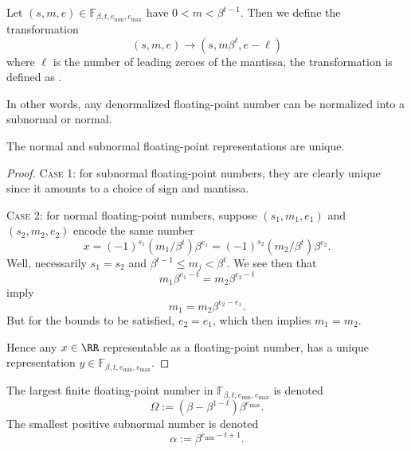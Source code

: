 \begin{defn}
Let $(s,m,e)\in\mathbb{F}_{\beta,t,e_{\text{min}},e_{\text{max}}}$
have $0<m<\beta^{t-1}$. Then we define the transformation
\begin{equation}
  (s,m,e)\to(s,m\beta^{\ell},e-\ell)
\end{equation}
where $\ell$ is the number of leading zeroes of the mantissa, the
transformation is defined as .
\end{defn}

\begin{rmk}
In other words, any denormalized floating-point number can be normalized
into a subnormal or normal.
\end{rmk}


\begin{thm}
The normal and subnormal floating-point representations are unique.
\end{thm}
\begin{proof}
\textsc{Case 1:} for subnormal floating-point numbers, they are clearly
unique since it amounts to a choice of sign and mantissa.

\textsc{Case 2:} for normal floating-point numbers, suppose
$(s_{1},m_{1},e_{1})$ and $(s_{2},m_{2},e_{2})$ encode the same number
\begin{equation}
  x = (-1)^{s_{1}}(m_{1}/\beta^{t})\beta^{e_{1}} = (-1)^{s_{2}}(m_{2}/\beta^{t})\beta^{e_{2}}.
\end{equation}
Well, necessarily $s_{1}=s_{2}$ and $\beta^{t-1}\leq m_{j} < \beta^{t}$.
We see then that
\begin{equation}
  m_{1}\beta^{e_{1}-t} = m_{2}\beta^{e_{2}-t}
\end{equation}
imply
\begin{equation}
  m_{1} = m_{2}\beta^{e_{2}-e_{1}}.
\end{equation}
But for the bounds to be satisfied, $e_{2}=e_{1}$, which then implies
$m_{1}=m_{2}$.

Hence any $x\in\RR$ representable as a floating-point number, has a unique
representation $y\in\mathbb{F}_{\beta,t,e_{\text{min}},e_{\text{max}}}$.
\end{proof}


\begin{defn}
  The largest finite floating-point number in $\mathbb{F}_{\beta,t,e_{\text{min}},e_{\text{max}}}$
  is denoted
  \begin{equation}
    \Omega := (\beta - \beta^{1-t})\beta^{e_{\text{max}}}.
  \end{equation}
  The smallest positive subnormal number is denoted
  \begin{equation}
    \alpha := \beta^{e_{\text{min}}-t+1}.
  \end{equation}
\end{defn}

